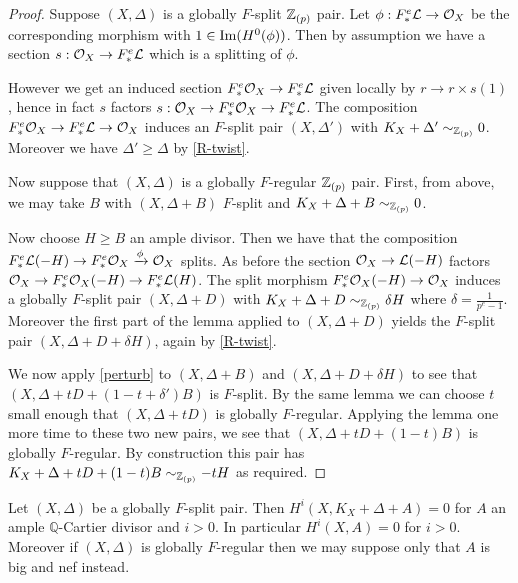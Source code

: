 \begin{proof}
	Suppose $(X,\Delta)$ is a globally $F$-split $\mathbb{Z}_{(p)}$ pair. Let $\phi:F_{*}^{e}\mathcal{L} \to \mathcal{O}_{X}$ be the corresponding morphism with $1 \in \textup{Im}(H^{0}(\phi))$. Then by assumption we have a section $s:\mathcal{O}_{X} \to F_{*}^{e}\mathcal{L}$ which is a splitting of $\phi$. 
	
	However we get an induced section $F_{*}^{e} \mathcal{O}_{X} \to F_{*}^{e}\mathcal{L}$ given locally by $r \to r\times s(1)$, hence in fact $s$ factors $s: \mathcal{O}_{X} \to F_{*}^{e}\mathcal{O}_{X} \to F_{*}^{e}\mathcal{L}$. The composition $F^{e}_{*} \mathcal{O}_{X} \to F^{e}_{*} \mathcal{L} \to \mathcal{O}_{X}$ induces an $F$-split pair $(X,\Delta')$ with $K_{X}+\Delta' \sim_{\mathbb{Z}_{(p)}} 0$. Moreover we have $\Delta' \geq \Delta$ by \autoref{R-twist}.
		
	Now suppose that $(X,\Delta)$ is a globally $F$-regular $\mathbb{Z}_{(p)}$ pair. First, from above, we may take $B$ with $(X,\Delta+B)$ $F$-split and $K_{X}+\Delta+B \sim_{\mathbb{Z}_{(p)}} 0$.
	
	Now choose $H\geq B$ an ample divisor. Then we have that the composition $F^{e}_{*} \mathcal{L}(-H) \to F^{e}_{*} \mathcal{O}_{X} \xrightarrow{\phi} \mathcal{O}_{X}$ splits. As before the section $\mathcal{O}_{X} \to \mathcal{L}(-H)$ factors $\mathcal{O}_{X} \to F^{e}_{*}\mathcal{O}_{X}(-H) \to F^{e}_{*} \mathcal{L}(H)$. The split morphism $F^{e}_{*}\mathcal{O}_{X}(-H) \to \mathcal{O}_{X}$ induces a globally $F$-split pair $(X,\Delta+D)$ with $K_{X}+\Delta+D \sim_{\mathbb{Z}_{(p)}} \delta H$ where $\delta=\frac{1}{p^{e}-1}$. Moreover the first part of the lemma applied to $(X,\Delta+D)$ yields the $F$-split pair $(X,\Delta+D+\delta H)$, again by \autoref{R-twist}.
	
	We now apply \autoref{perturb} to $(X,\Delta+B)$ and $(X,\Delta+D+\delta H)$ to see that $(X,\Delta+ tD + (1-t+\delta')B)$ is $F$-split. By the same lemma we can choose $t$ small enough that $(X,\Delta+tD)$ is globally $F$-regular. Applying the lemma one more time to these two new pairs, we see that $(X,\Delta+tD+(1-t)B)$ is globally $F$-regular. By construction this pair has $K_{X}+\Delta+tD+(1-t)B \sim_{\mathbb{Z}_{(p)}} -tH$ as required. 
		
\end{proof}

\begin{lemma}\label{vanish}
	
	Let $(X,\Delta)$ be a globally $F$-split pair. Then $H^{i}(X,K_{X}+\Delta+A)=0$ for $A$ an ample $\mathbb{Q}$-Cartier divisor and $i> 0$. In particular $H^{i}(X,A)=0$ for $i> 0$. Moreover if $(X,\Delta)$ is globally $F$-regular then we may suppose only that $A$ is big and nef instead.
	
	\end{lemma}

